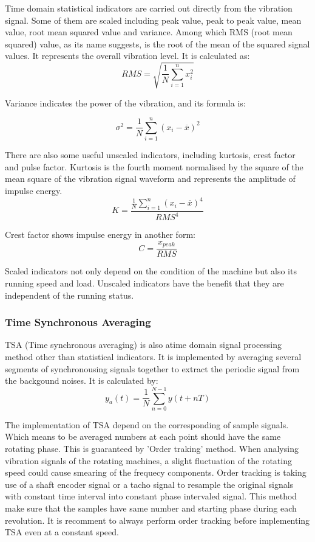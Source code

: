 Time domain statistical indicators are carried out directly from the vibration signal. Some of them are scaled including peak value, peak to peak value, mean value, root mean squared value and variance.
Among which RMS (root mean squared) value, as its name suggests, is the root of the mean of the squared signal values. It represents the overall vibration level. It is calculated as:
\begin{equation}
	RMS = \sqrt{\frac{1}{N}\sum_{i=1}^n x_{i}^2}
\end{equation}

Variance indicates the power of the vibration, and its formula is:

\begin{equation}
	\sigma^2 = \frac{1}{N}\sum_{i=1}^n (x_{i} - \overline{x})^2
\end{equation}

There are also some useful unscaled indicators, including kurtosis, crest factor and pulse factor. Kurtosis is the fourth moment normalised by the square of the mean square of the vibration signal waveform and represents the amplitude of impulse energy. \cite{trending} 
\begin{equation}
	K = \frac{\frac{1}{N}\sum_{i=1}^n (x_{i} - \overline{x})^4}{RMS^4}
\end{equation}

Crest factor shows impulse energy in another form:
\begin{equation}
	C = \frac{x_{peak}}{RMS}
\end{equation}

Scaled indicators not only depend on the condition of the machine but also its running speed and load. Unscaled indicators have the benefit that they are independent of the running status.

\subsubsection{Time Synchronous Averaging}

TSA (Time synchronous averaging) is also atime domain signal processing method other than statistical indicators. It is implemented by averaging several segments of synchronousing signals together to extract the periodic signal from the backgound noises. It is calculated by:
\begin{equation}
	y_{a}(t) = \frac{1}{N}\sum_{n=0}^{N-1} y(t+nT)
\end{equation}

The implementation of TSA depend on the corresponding of sample signals. Which means to be averaged numbers at each point should have the same rotating phase. This is guaranteed by 'Order traking' method. When analysing vibration signals of the rotating machines, a slight fluctuation of the rotating speed could cause smearing of the frequecy components. Order tracking is taking use of a shaft encoder signal or a tacho signal to resample the original signals with constant time interval into constant phase intervaled signal. This method make sure that the samples have same number and starting phase during each revolution. It is recomment to always perform order tracking before implementing TSA even at a constant speed.


